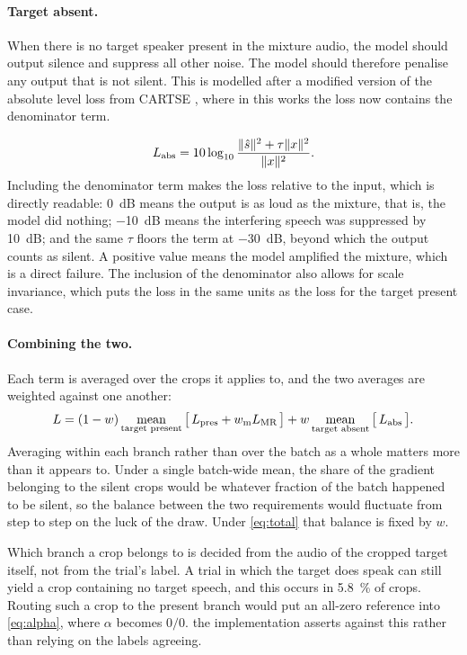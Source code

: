 \paragraph{Target absent.}
When there is no target speaker present in the mixture audio, the model should output silence and suppress all other noise. The model should therefore penalise any output that is not silent. This is modelled after a modified version of the absolute level loss from CARTSE \cite{li2026cartse}, where in this works the loss now contains the denominator term. 

\begin{equation}
L_\textup{abs} = 10 \log_{10}
  \frac{\lVert \hat{s} \rVert^2 + \tau \lVert x \rVert^2}
       {\lVert x \rVert^2}.
\label{eq:labs}
\end{equation}
 Including the denominator term makes the loss relative to the input, which is directly readable: \SI{0}{dB} means the output is as loud as the mixture, that is, the model did nothing; \SI{-10}{dB} means the interfering speech was suppressed by \SI{10}{dB}; and the same $\tau$ floors the term at \SI{-30}{dB}, beyond which the output counts as silent. A positive value means the
model amplified the mixture, which is a direct failure. The inclusion of the denominator also allows for scale invariance, which puts the loss in the same units as the loss for the target present case.

\paragraph{Combining the two.}
Each term is averaged over the crops it applies to, and the two averages are
weighted against one another:
\begin{equation}
L = (1 - w) \operatorname*{mean}_{\textup{target present}}
      \big[\, L_\textup{pres} + w_\textup{m} L_\textup{MR} \,\big]
  + w \operatorname*{mean}_{\textup{target absent}}
      \big[\, L_\textup{abs} \,\big].
\label{eq:total}
\end{equation}
Averaging within each branch rather than over the batch as a whole matters more
than it appears to. Under a single batch-wide mean, the share of the gradient
belonging to the silent crops would be whatever fraction of the batch happened to
be silent, so the balance between the two requirements would fluctuate from step to
step on the luck of the draw. Under \eqref{eq:total} that balance is fixed by $w$.

Which branch a crop belongs to is decided from the audio of the cropped target
itself, not from the trial's label. A trial in which the target does speak can
still yield a crop containing no target speech, and this occurs in \SI{5.8}{\percent}
of crops. Routing such a crop to the present branch would put an all-zero reference
into \eqref{eq:alpha}, where $\alpha$ becomes $0/0$. the implementation asserts
against this rather than relying on the labels agreeing.

